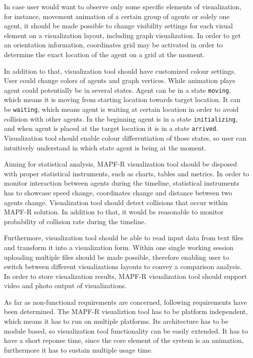 \documentclass[thesis=B,english]{FITthesis}[2019/12/23]
\begin{document}
In case user would want to observe only some specific elements of visualization, for instance, movement animation of a certain group of agents or solely one agent, it should be made possible to change visibility settings for each visual element on a visualization layout, including graph visualization. In order to get an orientation information, coordinates grid may be activated in order to determine the exact location of the agent on a grid at the moment.

In addition to that, visualization tool should have customized colour settings. User could change colors of agents and graph vertices. While animation plays agent could potentially be in several states. Agent can be in a state \verb|moving|, which means it is moving from starting location towards target location. It can be \verb|waiting|, which means agent is waiting at certain location in order to avoid collision with other agents. In the beginning agent is in a state \verb|initializing|, and when agent is placed at the target location it is in a state \verb|arrived|. Visualization tool should enable colour differentiation of those states, so user can intuitively understand in which state agent is being at the moment.

Aiming for statistical analysis, MAPF-R visualization tool should be disposed with proper statistical instruments, such as charts, tables and metrics. In order to monitor interaction between agents during the timeline, statistical instruments has to showcase speed change, coordinates change and distance between two agents change.
Visualization tool should detect collisions that occur within MAPF-R solution. In addition to that, it would be reasonable to monitor probability of collision rate during the timeline.

Furthermore, visualization tool should be able to read input data from text files and transform it into a visualization form. Within one single working session uploading multiple files should be made possible, therefore enabling user to switch between different visualizations layouts to convey a comparison analysis. In order to store visualization results, MAPF-R visualization tool should support video and photo output of visualizations.

As far as non-functional requirements are concerned, following requirements have been determined. The MAPF-R visualiztion tool has to be platform independent, which means it has to run on multiple platforms. Its architecture has to be module based, so visualization tool functionality can be easily extended. It has to have a short reponse time, since the core element of the system is an animation, furthermore it has to sustain multiple usage time.         
\end{document}

